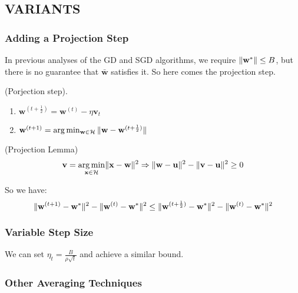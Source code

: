 \subsection{VARIANTS}

\subsubsection{Adding a Projection Step}

In previous analyses of the GD and SGD algorithms, we require $ \Arrowvert \mathbf{w}^* \Arrowvert \le B $,
but there is no guarantee that $ \bar{\mathbf{w}} $ satisfies it. So here comes the projection step.

\begin{defn}
	(Porjection step).
	\begin{enumerate}
		\item $ \mathbf{w}^{(t+\frac{1}{2})} = \mathbf{w}^{(t)} - \eta \mathbf{v}_t $
		\item $ \mathbf{w}^{(t+1)} = \arg\min_{\mathbf{w} \in \mathcal{H}} 
			\Arrowvert \mathbf{w} - \mathbf{w}^{(t+\frac{1}{2})} \Arrowvert $
	\end{enumerate}
\end{defn}

\begin{lem}
	(Projection Lemma)
	\[ 
		\mathbf{v} = \underset{\mathbf{x}\in\mathcal{H}}{\arg\min} \Arrowvert \mathbf{x} - \mathbf{w} \Arrowvert^2 
		\Rightarrow
		\Arrowvert \mathbf{w} - \mathbf{u} \Arrowvert^2
		-
		\Arrowvert \mathbf{v} - \mathbf{u} \Arrowvert^2
		\ge 0
	\]
\end{lem}

So we have:
\[ 
	\Arrowvert \mathbf{w}^{(t+1)} - \mathbf{w}^* \Arrowvert^2
	- \Arrowvert \mathbf{w}^{(t)} - \mathbf{w}^* \Arrowvert^2
	\le
	\Arrowvert \mathbf{w}^{(t+\frac{1}{2})} - \mathbf{w}^* \Arrowvert^2
	- \Arrowvert \mathbf{w}^{(t)} - \mathbf{w}^* \Arrowvert^2
\]

\subsubsection{Variable Step Size}

We can set $ \eta_t = \frac{B}{\rho \sqrt t} $ and achieve a similar bound.

\subsubsection{Other Averaging Techniques}

